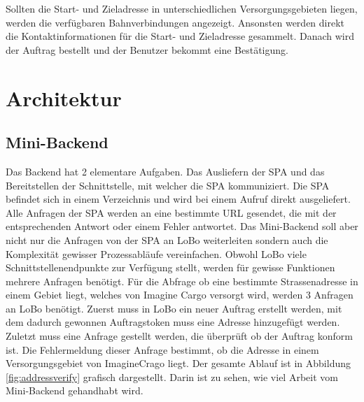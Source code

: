 Sollten die Start- und Zieladresse in unterschiedlichen Versorgungsgebieten liegen, werden die verfügbaren Bahnverbindungen angezeigt. Ansonsten werden direkt die Kontaktinformationen für die Start- und Zieladresse gesammelt. Danach wird der Auftrag bestellt und der Benutzer bekommt eine Bestätigung.


\section{Architektur}
\label{sec:architektur}

\subsection{Mini-Backend}
Das Backend hat 2 elementare Aufgaben. Das Ausliefern der SPA und das Bereitstellen der Schnittstelle, mit welcher die SPA kommuniziert. Die SPA befindet sich in einem Verzeichnis und wird bei einem Aufruf direkt ausgeliefert. Alle Anfragen der SPA werden an eine bestimmte URL gesendet, die mit der entsprechenden Antwort oder einem Fehler antwortet. Das Mini-Backend soll aber nicht nur die Anfragen von der SPA an LoBo weiterleiten sondern auch die Komplexität gewisser Prozessabläufe vereinfachen. Obwohl LoBo viele Schnittstellenendpunkte zur Verfügung stellt, werden für gewisse Funktionen mehrere Anfragen benötigt. Für die Abfrage ob eine bestimmte Strassenadresse in einem Gebiet liegt, welches von Imagine Cargo versorgt wird, werden 3 Anfragen an LoBo benötigt. Zuerst muss in LoBo ein neuer Auftrag erstellt werden, mit dem dadurch gewonnen Auftragstoken muss eine Adresse hinzugefügt werden. Zuletzt muss eine Anfrage gestellt werden, die überprüft ob der Auftrag konform ist. Die Fehlermeldung dieser Anfrage bestimmt, ob die Adresse in einem Versorgungsgebiet von ImagineCrago liegt. Der gesamte Ablauf ist in Abbildung \ref{fig:addressverify} grafisch dargestellt. Darin ist zu sehen, wie viel Arbeit vom Mini-Backend gehandhabt wird.

